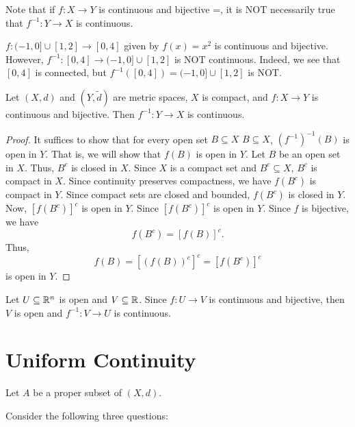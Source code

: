 \documentclass[a4paper]{article}
\begin{document}
Note that if \( f : X \to  Y \) is continuous and bijective =, it is NOT necessarily true that \( f^{-1}: Y \to X  \) is continuous.

\begin{eg}
    \( f: (-1,0] \cup [1,2] \to [0,4] \) given by \( f(x) = x^{2} \) is continuous and bijective. However, \( f^{-1}: [0,4] \to (-1,0] \cup [1,2] \) is NOT continuous. Indeed, we see that \( [0,4] \) is connected, but \( f^{-1}([0,4]) = (-1,0] \cup [1,2] \) is NOT.  
\end{eg}  

\begin{theorem}
    Let \( (X,d) \) and \( (Y,\tilde{d}) \) are metric spaces, \( X  \) is compact, and \( f: X \to Y  \) is continuous and bijective. Then \( f^{-1}: Y \to X  \) is continuous.
\end{theorem}
\begin{proof}
    It suffices to show that for every open set \( B \subseteq  X  \) \( B \subseteq  X  \), \( (f^{-1})^{-1}(B) \) is open in \( Y \). That is, we will show that \( f(B) \) is open in \( Y \). Let \( B  \) be an open set in \( X  \). Thus, \( B^{c} \) is closed in \( X  \). Since \( X  \) is a compact set and \( B^{c} \subseteq  X  \), \( B^{c} \) is compact in \( X  \). Since continuity preserves compactness, we have \( f(B^{c}) \) is compact in \( Y \). Since compact sets are closed and bounded, \( f(B^{c}) \) is closed in \( Y \). Now, \( [f(B^{c})]^{c} \) is open in \( Y \). Since \( [f(B^{c})]^{c} \) is open in \( Y \). Since \( f  \) is bijective, we have 
    \[  f(B^{c}) = [f(B)]^{c}. \] 
    Thus,
    \[ f(B) = [(f(B))^{c}]^{c} = [f(B^{c})]^{c} \]
    is open in \( Y \).
\end{proof}

\begin{remark}
   Let \( U \subseteq \mathbb{R}^{n} \) is open and \(V \subseteq \mathbb{R}  \). Since \( f: U \to V  \) is continuous and bijective, then \( V  \) is open and \( f^{-1}: V \to U \) is continuous. 
\end{remark}

\section{Uniform Continuity}

Let \( A  \) be a proper subset of \( (X,d) \).

Consider the following three questions:
\end{document}
